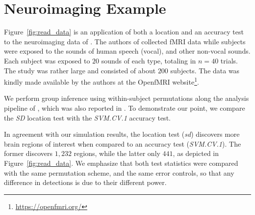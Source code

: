 \documentclass[12pt,a4paper]{article}
\begin{document}
\section{Neuroimaging Example}
\label{sec:example}

Figure~\ref{fig:read_data} is an application of both a location and an accuracy test to the neuroimaging data of \cite{pernet_human_2015}. 
The authors of \cite{pernet_human_2015} collected fMRI data while subjects were exposed to the sounds of human speech (vocal), and other non-vocal sounds. 
Each subject was exposed to $20$ sounds of each type, totaling in $n=40$ trials.
The study was rather large and consisted of about $200$ subjects.
The data was kindly made available by the authors at the OpenfMRI website\footnote{\url{https://openfmri.org/}}.

We perform group inference using within-subject permutations along the analysis pipeline of \cite{stelzer_statistical_2013}, which was also reported in \cite{gilron_quantifying_2016}. 
To demonstrate our point, we compare the \emph{SD} location test with the \emph{SVM.CV.1} accuracy test. 

In agreement with our simulation results, the location test (\emph{sd}) discovers more brain regions of interest when compared to an accuracy test (\emph{SVM.CV.1}).
The former discovers $1,232$ regions, while the latter only $441$, as depicted in Figure~\ref{fig:read_data}.
We emphasize that both test statistics were compared with the same permutation scheme, and the same error controls, so that any difference in detections is due to their different power.
\end{document}
